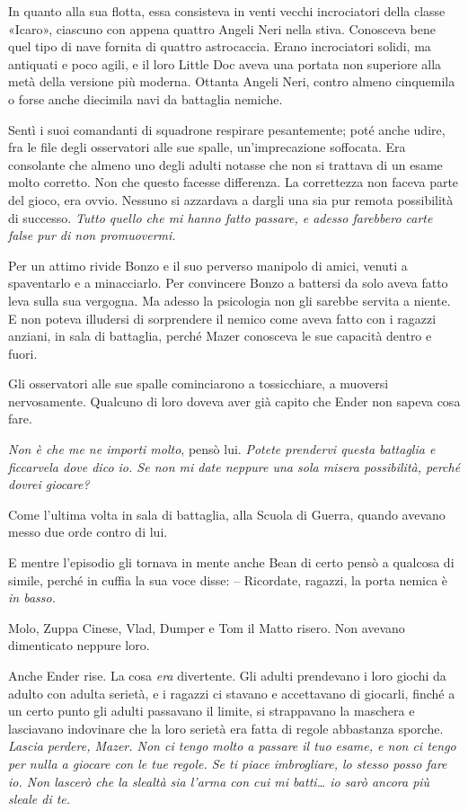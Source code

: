 {In quanto alla sua flotta, essa consisteva in venti vecchi incrociatori
	della classe «Icaro», ciascuno con appena quattro Angeli Neri nella
	stiva. Conosceva bene quel tipo di nave fornita di quattro astrocaccia.
	Erano incrociatori solidi, ma antiquati e poco agili, e il loro Little
	Doc aveva una portata non superiore alla metà della versione più
	moderna. Ottanta Angeli Neri, contro almeno cinquemila o forse anche
	diecimila navi da battaglia nemiche.}

{Sentì i suoi comandanti di squadrone respirare pesantemente; poté anche
	udire, fra le file degli osservatori alle sue spalle, un'imprecazione
	soffocata. Era consolante che almeno uno degli adulti notasse che non si
	trattava di un esame molto corretto. Non che questo facesse differenza.
	La correttezza non faceva parte del gioco, era ovvio. Nessuno si
	azzardava a dargli una sia pur remota possibilità di successo.
	\emph{Tutto quello che mi hanno fatto passare, e adesso farebbero carte
		false pur di non promuovermi.}}

{Per un attimo rivide Bonzo e il suo perverso manipolo di amici, venuti
	a spaventarlo e a minacciarlo. Per convincere Bonzo a battersi da solo
	aveva fatto leva sulla sua vergogna. Ma adesso la psicologia non gli
	sarebbe servita a niente. E non poteva illudersi di sorprendere il
	nemico come aveva fatto con i ragazzi anziani, in sala di battaglia,
	perché Mazer conosceva le sue capacità dentro e fuori.}

{Gli osservatori alle sue spalle cominciarono a tossicchiare, a muoversi
	nervosamente. Qualcuno di loro doveva aver già capito che Ender non
	sapeva cosa fare.}

\emph{{Non è che me ne importi molto}}{, \emph{} pensò lui. \emph{Potete
		prendervi questa battaglia e ficcarvela dove dico io. Se non mi date
		neppure una sola misera possibilità, perché dovrei giocare?}}

{Come l'ultima volta in sala di battaglia, alla Scuola di Guerra, quando
	avevano messo due orde contro di lui.}

{E mentre l'episodio gli tornava in mente anche Bean di certo pensò a
	qualcosa di simile, perché in cuffia la sua voce disse: -- Ricordate,
	ragazzi, la porta nemica è \emph{in basso.}}

{Molo, Zuppa Cinese, Vlad, Dumper e Tom il Matto risero. Non avevano
	dimenticato neppure loro.}

{Anche Ender rise. La cosa \emph{era} divertente. Gli adulti prendevano
	i loro giochi da adulto con adulta serietà, e i ragazzi ci stavano e
	accettavano di giocarli, finché a un certo punto gli adulti passavano il
	limite, si strappavano la maschera e lasciavano indovinare che la loro
	serietà era fatta di regole abbastanza sporche. \emph{Lascia perdere,
		Mazer. Non ci tengo molto a passare il tuo esame, e non ci tengo per
		nulla a giocare con le tue regole. Se ti piace imbrogliare, lo stesso
		posso fare io. Non lascerò che la slealtà sia l'arma con cui mi
		batti\ldots{} io sarò ancora più sleale di te.}}

